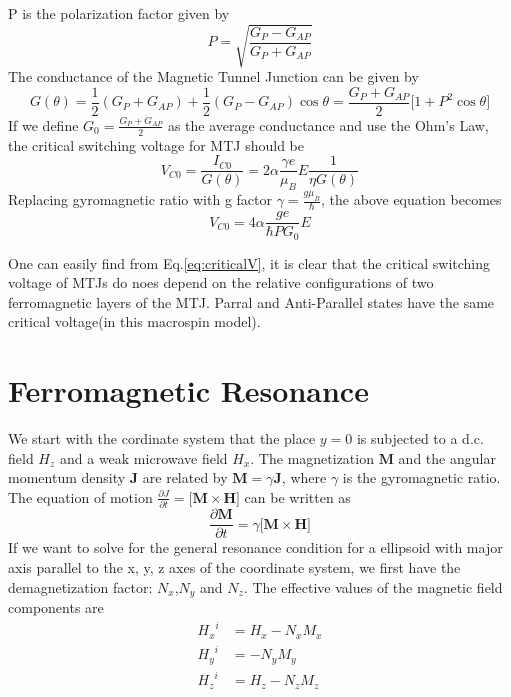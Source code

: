 P is the polarization factor given by
\begin{equation}
    P = \sqrt{\frac{G_P - G_{AP}}{ G_P + G_{AP}} }       
\end{equation}
The conductance of the Magnetic Tunnel Junction can be given by\cite{MTJConductance}
\begin{equation}
    G(\theta) = \frac{1}{2} (G_P + G_{AP}) + \frac{1}{2} (G_P - G_{AP}) \cos{\theta}
    = \frac{G_P + G_{AP}}{2}\big[ 1+P^2\cos{\theta} \big]
\end{equation}
If we define $G_0 = \frac{G_P + G_{AP}}{2}$ as the average conductance and use the Ohm's Law, the critical switching voltage for MTJ should be
\begin{equation}
    V_{C0} = \frac{I_{C0}}{G(\theta)} = 2\alpha\frac{\gamma e}{\mu_B}E\frac{1}{\eta G(\theta)}
\end{equation}
Replacing gyromagnetic ratio with g factor $\gamma = \frac{g \mu_B}{\hbar}$, the above equation becomes
\begin{equation}
    \label{eq:criticalV}
    V_{C0} = 4\alpha\frac{ge}{\hbar P G_0}E
\end{equation}

One can easily find from Eq.\ref{eq:criticalV}, it is clear that the critical switching voltage of MTJs do noes depend on the relative configurations of two ferromagnetic layers of the MTJ. Parral and Anti-Parallel states have the same critical voltage(in this macrospin model).  








\section{Ferromagnetic Resonance}
We start with the cordinate system that the place $y=0$ is subjected to a d.c. field $H_z$ and a weak microwave field $H_x$. The magnetization $\boldsymbol{M}$ and the angular momentum density $\boldsymbol{J}$ are related by $\boldsymbol{M} = \gamma \boldsymbol{J}$\cite{Kittel1947}\cite{Kittel}, where $\gamma$ is the gyromagnetic ratio. The equation of motion $\frac{\partial J}{\partial t} = \big[\boldsymbol{M} \times \boldsymbol{H}]$ can be written as 
\begin{equation}
    \label{eq:Mmotion}
    \frac{\partial \boldsymbol{M}}{\partial t} = \gamma \big[\boldsymbol{M} \times \boldsymbol{H}]
\end{equation}
If we want to solve for the general resonance condition for a ellipsoid with major axis parallel to the x, y, z axes of the coordinate system, we first have the demagnetization factor: $N_x$,$N_y$ and $N_z$. The effective values of the magnetic field components are
\begin{equation}
\label{eq:MvsT}
\begin{aligned}
{H_x}^i &= H_x - N_x M_x \\
{H_y}^i &=  - N_y M_y \\
{H_z}^i &= H_z - N_z M_z \\
\end{aligned}
\end{equation}

